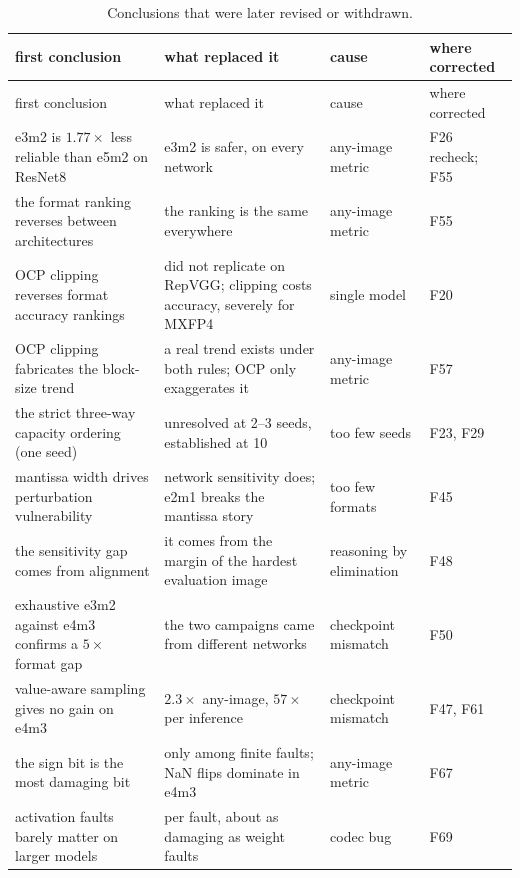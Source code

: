\begin{center}
\small
\begin{longtable}{@{}p{4.2cm}p{4.9cm}p{2.1cm}p{2.9cm}@{}}
\caption{Conclusions that were later revised or withdrawn.}\label{tab:revised}\\
\toprule
first conclusion & what replaced it & cause & where corrected \\
\midrule
\endfirsthead
\toprule
first conclusion & what replaced it & cause & where corrected \\
\midrule
\endhead
e3m2 is $1.77\times$ less reliable than e5m2 on ResNet8 & e3m2 is safer, on every network & any-image metric & F26 recheck; F55 \\
the format ranking reverses between architectures & the ranking is the same everywhere & any-image metric & F55 \\
OCP clipping reverses format accuracy rankings & did not replicate on RepVGG; clipping costs accuracy, severely for MXFP4 & single model & F20 \\
OCP clipping fabricates the block-size trend & a real trend exists under both rules; OCP only exaggerates it & any-image metric & F57 \\
the strict three-way capacity ordering (one seed) & unresolved at 2--3 seeds, established at 10 & too few seeds & F23, F29 \\
mantissa width drives perturbation vulnerability & network sensitivity does; e2m1 breaks the mantissa story & too few formats & F45 \\
the sensitivity gap comes from alignment & it comes from the margin of the hardest evaluation image & reasoning by elimination & F48 \\
exhaustive e3m2 against e4m3 confirms a $5\times$ format gap & the two campaigns came from different networks & checkpoint mismatch & F50 \\
value-aware sampling gives no gain on e4m3 & $2.3\times$ any-image, $57\times$ per inference & checkpoint mismatch & F47, F61 \\
the sign bit is the most damaging bit & only among finite faults; NaN flips dominate in e4m3 & any-image metric & F67 \\
activation faults barely matter on larger models & per fault, about as damaging as weight faults & codec bug & F69 \\
\bottomrule
\end{longtable}
\end{center}

